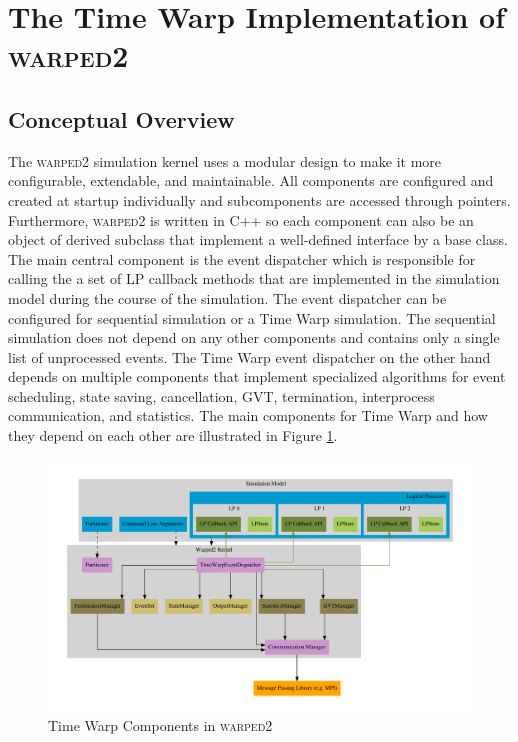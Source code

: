 \documentclass[11pt]{book}
\begin{document}
\section{The Time Warp Implementation of \textsc{warped2}}

\subsection{Conceptual Overview}

The \textsc{warped2} simulation kernel uses a modular design to make it more configurable,
extendable, and maintainable.  All components are configured and created at startup individually
and subcomponents are accessed through pointers.  Furthermore, \textsc{warped2} is written in
C++ so each component can also be an object of derived subclass that implement a well-defined
interface by a base class.  The main central component is the event dispatcher which is responsible
for calling the a set of LP callback methods that are implemented in the simulation model during
the course of the simulation.  The event dispatcher can be configured for sequential simulation
or a Time Warp simulation.  The sequential simulation does not depend on any other components and
contains only a single list of unprocessed events.  The Time Warp event dispatcher on the other
hand depends on multiple components that implement specialized algorithms for event scheduling,
state saving, cancellation, GVT, termination, interprocess communication, and statistics.  The
main components for Time Warp and how they depend on each other are illustrated in Figure
\ref{warped2_architecture}.

\begin{figure}
    \centering
    \includegraphics[width=\textwidth,quiet]{figs/graphviz/warped2_overview.pdf}
    \caption{Time Warp Components in \textsc{warped2}}\label{warped2_architecture}
\end{figure}
\end{document}
